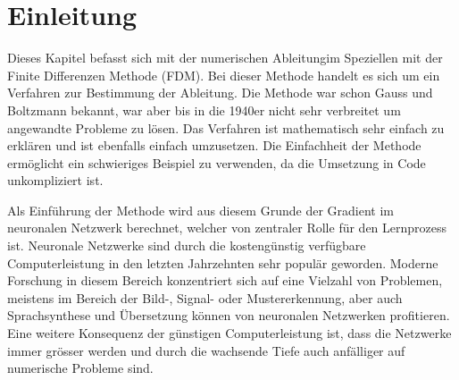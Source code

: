%
%
%
\section{Einleitung\label{ableitung:section:einleitung}}
Dieses Kapitel befasst sich mit der numerischen Ableitungim Speziellen mit der Finite Differenzen Methode (FDM).
Bei dieser Methode handelt es sich um ein Verfahren zur Bestimmung der Ableitung. Die Methode war schon Gauss und Boltzmann bekannt, war aber bis in die 1940er nicht sehr verbreitet um angewandte Probleme zu lösen. Das Verfahren ist mathematisch sehr einfach zu erklären und ist ebenfalls einfach umzusetzen. Die Einfachheit der Methode ermöglicht ein schwieriges Beispiel zu verwenden, da die Umsetzung in Code unkompliziert ist.

Als Einführung der Methode wird aus diesem Grunde der Gradient im neuronalen Netzwerk berechnet, welcher von zentraler Rolle für den Lernprozess ist.
Neuronale Netzwerke sind durch die kostengünstig verfügbare Computerleistung in den letzten Jahrzehnten sehr populär geworden. Moderne Forschung in diesem Bereich konzentriert sich auf eine Vielzahl von Problemen, meistens im Bereich der Bild-, Signal- oder Mustererkennung, aber auch Sprachsynthese und Übersetzung können von neuronalen Netzwerken profitieren. Eine weitere Konsequenz der günstigen Computerleistung ist, dass die Netzwerke immer grösser werden und durch die wachsende Tiefe auch anfälliger auf numerische Probleme sind.